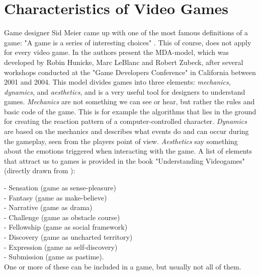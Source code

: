 \chapter{Characteristics of Video Games} 
\label{chap:vg}
Game designer Sid Meier came up with one of the most famous definitions of a game: "A game is a series of interesting choices" \cite{understandingvg}. This of course, does not apply for every video game. In \cite{understandingvg} the authors present the MDA-model, which was developed by Robin Hunicke, Marc LeBlanc and Robert Zubeck, after several workshops conducted at the "Game Developers Conference" in California between 2001 and 2004. This model divides games into three elements: \emph{mechanics}, \emph{dynamics}, and \emph{aesthetics}, and is a very useful tool for designers to understand games. \emph{Mechanics} are not something we can see or hear, but rather the rules and basic code of the game. This is for example the algorithms that lies in the ground for creating the reaction pattern of a computer-controlled character. \emph{Dynamics} are based on the mechanics and describes what events do and can occur during the gameplay, seen from the players point of view. \emph{Aesthetics} say something about the emotions triggered when interacting with the game. A list of elements  that attract us to games is provided in the book "Understanding Videogames" (directly drawn from \cite{understandingvg}): 

- Sensation (game as sense-pleasure)\\
- Fantasy (game as make-believe)\\
- Narrative (game as drama)\\
- Challenge (game as obstacle course)\\
- Fellowship (game as social framework)\\
- Discovery (game as uncharted territory)\\
- Expression (game as self-discovery)\\
- Submission (game as pastime).\\
One or more of these can be included in a game, but usually not all of them.

